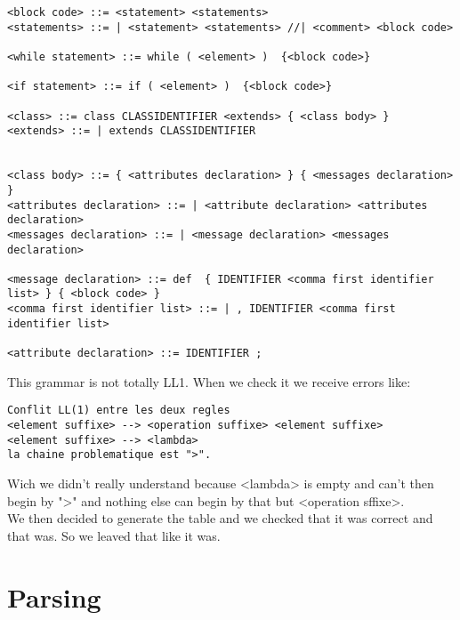 \documentclass{eplDoc}
\begin{document}
\begin{lstlisting}
<block code> ::= <statement> <statements>
<statements> ::= | <statement> <statements> //| <comment> <block code>

<while statement> ::= while ( <element> )  {<block code>}

<if statement> ::= if ( <element> )  {<block code>}

<class> ::= class CLASSIDENTIFIER <extends> { <class body> }
<extends> ::= | extends CLASSIDENTIFIER


<class body> ::= { <attributes declaration> } { <messages declaration> }
<attributes declaration> ::= | <attribute declaration> <attributes declaration>
<messages declaration> ::= | <message declaration> <messages declaration>

<message declaration> ::= def  { IDENTIFIER <comma first identifier list> } { <block code> }
<comma first identifier list> ::= | , IDENTIFIER <comma first identifier list>

<attribute declaration> ::= IDENTIFIER ;
\end{lstlisting}

This grammar is not totally LL1.  When we check it we receive errors like:
\begin{lstlisting}
Conflit LL(1) entre les deux regles 
<element suffixe> --> <operation suffixe> <element suffixe> 
<element suffixe> --> <lambda>
la chaine problematique est ">".
\end{lstlisting}
Wich we didn't really understand because <lambda> is empty and can't then begin by ">" and nothing else can begin by that but <operation sffixe>.\\
We then decided to generate the table and we checked that it was correct and that was. So we leaved that like it was.


\section{Parsing}
\end{document}
